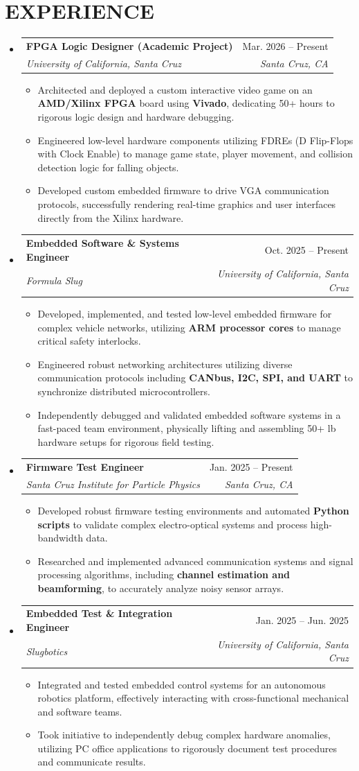 \documentclass[letterpaper,11pt]{article}
\makeatletter
\newcommand{\resumeItem}[1]{
  \item\small{
    {#1 \vspace{-2pt}}
  }
}
\newcommand{\resumeSubheading}[4]{
  \vspace{-2pt}\item
    \begin{tabular*}{0.97\textwidth}[t]{l@{\extracolsep{\fill}}r}
      \textbf{#1} & #2 \\
      \textit{\small#3} & \textit{\small #4} \\
    \end{tabular*}\vspace{-7pt}
}
\newcommand{\resumeSubHeadingListStart}{\begin{itemize}[leftmargin=0.15in, label={}]}
\newcommand{\resumeSubHeadingListEnd}{\end{itemize}}
\newcommand{\resumeItemListStart}{\begin{itemize}}
\newcommand{\resumeItemListEnd}{\end{itemize}\vspace{-5pt}}
\makeatother
\begin{document}
\section{EXPERIENCE}
  \resumeSubHeadingListStart
    \resumeSubheading
      {FPGA Logic Designer (Academic Project)}{Mar. 2026 -- Present}
      {University of California, Santa Cruz}{Santa Cruz, CA}
      \resumeItemListStart
        \resumeItem{Architected and deployed a custom interactive video game on an \textbf{AMD/Xilinx FPGA} board using \textbf{Vivado}, dedicating 50+ hours to rigorous logic design and hardware debugging.}
        \resumeItem{Engineered low-level hardware components utilizing FDREs (D Flip-Flops with Clock Enable) to manage game state, player movement, and collision detection logic for falling objects.}
        \resumeItem{Developed custom embedded firmware to drive VGA communication protocols, successfully rendering real-time graphics and user interfaces directly from the Xilinx hardware.}
      \resumeItemListEnd
    \resumeSubheading
      {Embedded Software \& Systems Engineer}{Oct. 2025 -- Present}
      {Formula Slug}{University of California, Santa Cruz}
      \resumeItemListStart
        \resumeItem{Developed, implemented, and tested low-level embedded firmware for complex vehicle networks, utilizing \textbf{ARM processor cores} to manage critical safety interlocks.}
        \resumeItem{Engineered robust networking architectures utilizing diverse communication protocols including \textbf{CANbus, I2C, SPI, and UART} to synchronize distributed microcontrollers.}
        \resumeItem{Independently debugged and validated embedded software systems in a fast-paced team environment, physically lifting and assembling 50+ lb hardware setups for rigorous field testing.}
      \resumeItemListEnd
    \resumeSubheading
      {Firmware Test Engineer}{Jan. 2025 -- Present}
      {Santa Cruz Institute for Particle Physics}{Santa Cruz, CA}
      \resumeItemListStart
        \resumeItem{Developed robust firmware testing environments and automated \textbf{Python scripts} to validate complex electro-optical systems and process high-bandwidth data.}
        \resumeItem{Researched and implemented advanced communication systems and signal processing algorithms, including \textbf{channel estimation and beamforming}, to accurately analyze noisy sensor arrays.}
      \resumeItemListEnd
    \resumeSubheading
      {Embedded Test \& Integration Engineer}{Jan. 2025 -- Jun. 2025}
      {Slugbotics}{University of California, Santa Cruz}
      \resumeItemListStart
        \resumeItem{Integrated and tested embedded control systems for an autonomous robotics platform, effectively interacting with cross-functional mechanical and software teams.}
        \resumeItem{Took initiative to independently debug complex hardware anomalies, utilizing PC office applications to rigorously document test procedures and communicate results.}
      \resumeItemListEnd
  \resumeSubHeadingListEnd
\end{document}
